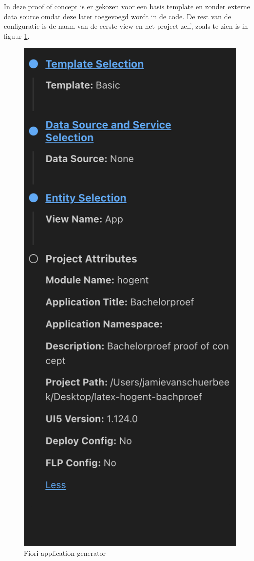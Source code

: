 In deze proof of concept is er gekozen voor een basis template en zonder externe data source omdat deze later toegevoegd wordt in de code. De rest van de configuratie is de naam van de eerste view en het project zelf, zoals te zien is in figuur \ref{fig:fiori-generator}.

\begin{figure}[H]
    \centering
    \includegraphics[scale=0.4]{./graphics/Fiori_config.png}
    \caption{Fiori application generator}
    \label{fig:fiori-generator}
\end{figure}

